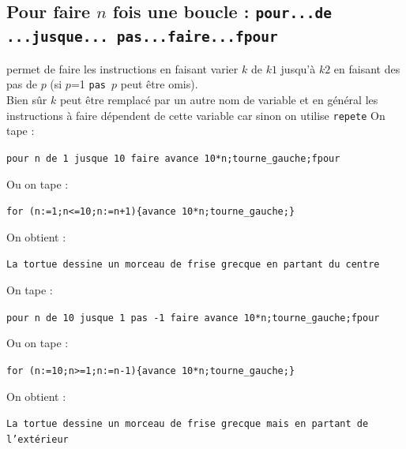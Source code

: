 \documentclass[a4paper,11pt]{book}
\begin{document}
\subsection{Pour faire $n$ fois une boucle : {\tt pour...de ...jusque... pas...faire...fpour}}
 permet de faire les instructions en faisant varier $k$ de  $k1$ jusqu'\`a
 $k2$ en faisant des pas de $p$ (si $p$=1 {\tt pas $p$} peut \^etre omis).\\
Bien s\^ur $k$ peut \^etre remplac\'e par un autre nom de variable et en 
g\'en\'eral les instructions \`a faire d\'ependent de cette variable car sinon 
on utilise {\tt repete}
On tape :
\begin{center}{\tt pour n de 1 jusque 10  faire avance 10*n;tourne\_gauche;fpour}\end{center}
Ou on tape :\\
\begin{center}{\tt for (n:=1;n<=10;n:=n+1)\{avance 10*n;tourne\_gauche;\}}\end{center}
On obtient :
\begin{center}{\tt La tortue dessine un morceau de frise grecque en partant du centre}\end{center}
On tape :
\begin{center}{\tt pour n de 10 jusque 1 pas -1 faire avance 10*n;tourne\_gauche;fpour}\end{center}
Ou on tape :\\
\begin{center}{\tt for (n:=10;n>=1;n:=n-1)\{avance 10*n;tourne\_gauche;\}}\end{center}
On obtient :
\begin{center}{\tt La tortue dessine un morceau de frise grecque mais en partant de l'ext\'erieur}\end{center}
\end{document}
